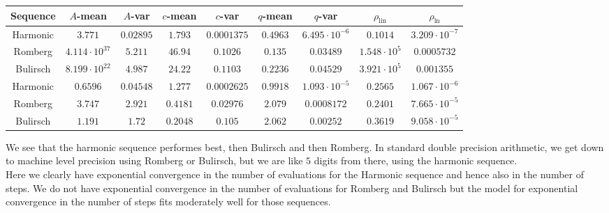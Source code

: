 \begin{table}[H]
    \centering
        \small
        \begin{tabular}{c||c|c|c|c|c|c|c|c}
Sequence & \(A\)-mean & \(A\)-var & \(c\)-mean & \(c\)-var & \(q\)-mean & \(q\)-var & \(\rho_{\operatorname{lin}}\) & \(\rho_{\ln}\)\\\hline
\rowcolor{green}
Harmonic & \(3.771\) & \(0.02895\) & \(1.793\) & \(0.0001375\) & \(0.4963\) & \(6.495\cdot 10^{-6}\) & \(0.1014\) & \(3.209\cdot 10^{-7}\) \\
\rowcolor{yellow}
Romberg & \(4.114\cdot 10^{37}\) & \(5.211\) & \(46.94\) & \(0.1026\) & \(0.135\) & \(0.03489\) & \(1.548\cdot 10^5\) & \(0.0005732\) \\
\rowcolor{yellow}
Bulirsch & \(8.199\cdot 10^{22}\) & \(4.987\) & \(24.22\) & \(0.1103\) & \(0.2236\) & \(0.04529\) & \(3.921\cdot 10^5\) & \(0.001355\) \\
\rowcolor{green}
Harmonic & \(0.6596\) & \(0.04548\) & \(1.277\) & \(0.0002625\) & \(0.9918\) & \(1.093\cdot 10^{-5}\) & \(0.2565\) & \(1.067\cdot 10^{-6}\) \\
\rowcolor{red}
Romberg & \(3.747\) & \(2.921\) & \(0.4181\) & \(0.02976\) & \(2.079\) & \(0.0008172\) & \(0.2401\) & \(7.665\cdot 10^{-5}\) \\
\rowcolor{red}
Bulirsch & \(1.191\) & \(1.72\) & \(0.2048\) & \(0.105\) & \(2.062\) & \(0.00252\) & \(0.3619\) & \(9.058\cdot 10^{-5}\) \\
    \end{tabular}
    \label{tab:my_label}
\end{table}

We see that the harmonic sequence performes best, then Bulirsch and then Romberg. In standard double precision arithmetic, we get down to machine level precision using Romberg or Bulirsch, but we are like \(5\) digits from there, using the harmonic sequence.\\

Here we clearly have exponential convergence in the number of evaluations for the Harmonic sequence and hence also in the number of steps. We do not have exponential convergence in the number of evaluations for Romberg and Bulirsch but the model for exponential convergence in the number of steps fits moderately well for those sequences. 

